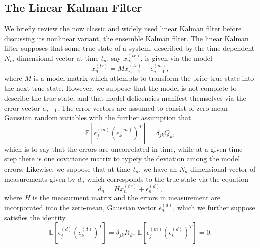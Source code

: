 \subsection*{The Linear Kalman Filter}
We briefly review the now classic and widely used linear Kalman filter before discussing its nonlinear variant, the ensemble Kalman filter.  The linear Kalman filter supposes that some true state of a system, described by the time dependent $N_{m}$-dimensional vector at time $t_{n}$, say $x^{(tr)}_{n}$, is given via the model 
\[
x^{(tr)}_{n} = Mx^{(tr)}_{n-1} + \epsilon^{(m)}_{n-1},
\]
where $M$ is a model matrix which attempts to transform the prior true state into the next true state.  However, we suppose that the model is not complete to describe the true state, and that model deficencies manifest themselves via the error vector $\epsilon_{n-1}$.  The error vectors are assumed to consist of zero-mean Gaussian random variables with the further assumption that 
\[
\mathbb{E}\left[\epsilon_{j}^{(m)}\left(\epsilon_{k}^{(m)}\right)^{T}\right] = \delta_{jk} Q_{k},
\]
which is to say that the errors are uncorrelated in time, while at a given time step there is one covariance matrix to typefy the deviation among the model errors.  Likewise, we suppose that at time $t_{n}$, we have an $N_{d}$-dimensional vector of measurements given by $d_{n}$ which corresponds to the true state via the equation 
\[
d_{n} = Hx^{(tr)}_{n} + \epsilon^{(d)}_{n},
\]
where $H$ is the measurment matrix and the errors in measurement are incorporated into the zero-mean, Gaussian vector $\epsilon^{(d)}_{n}$, which we further suppose satisfies the identity
\[
\mathbb{E}\left[\epsilon^{(d)}_{j}\left(\epsilon_{k}^{(d)}\right)^{T}\right] = \delta_{jk} R_{k}, ~ \mathbb{E}\left[\epsilon_{j}^{(m)}\left(\epsilon_{k}^{(d)}\right)^{T}\right] = 0.
\]

